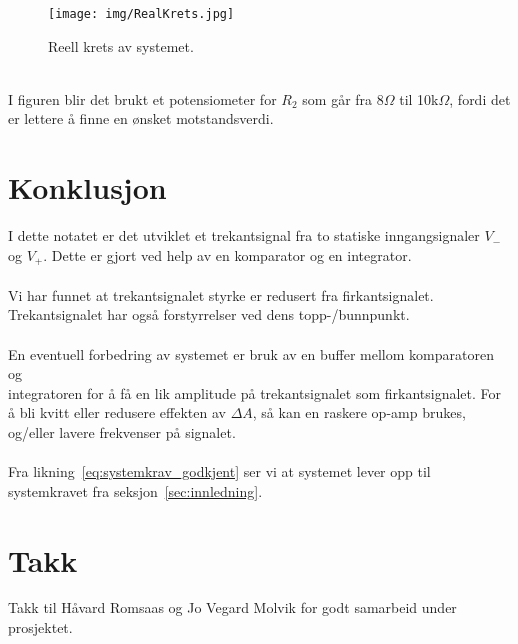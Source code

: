 \documentclass[a4paper,11pt,norsk]{article}
\begin{document}
\begin{figure}[htbp]
    \centering
    \texttt{[image: img/RealKrets.jpg]}
    \caption{Reell krets av systemet.}
    \label{fig:realKrets}
\end{figure}
\\
I figuren blir det brukt et potensiometer for $R_2$ som går fra 8$\Omega$ til 10k$\Omega$, fordi det er lettere å finne en ønsket motstandsverdi.
\newpage

\section{Konklusjon}
\label{sec:konklusjon}
I dette notatet er det utviklet et trekantsignal fra to statiske inngangsignaler $V_-$ og $V_+$.
Dette er gjort ved help av en komparator og en integrator.
\\\\
Vi har funnet at trekantsignalet styrke er redusert fra firkantsignalet. Trekantsignalet har også forstyrrelser ved dens topp-/bunnpunkt.
\\\\
En eventuell forbedring av systemet er bruk av en buffer mellom komparatoren og \\ integratoren for å få en lik amplitude på trekantsignalet som firkantsignalet.
For å bli kvitt eller redusere effekten av $\Delta A$, så kan en raskere op-amp brukes, og/eller lavere frekvenser på signalet.
\\\\
Fra likning~\ref{eq:systemkrav_godkjent} ser vi at systemet lever opp til systemkravet fra seksjon~\ref{sec:innledning}.

\section{Takk}
Takk til Håvard Romsaas og Jo Vegard Molvik for godt samarbeid under prosjektet.
\newpage
\end{document}
